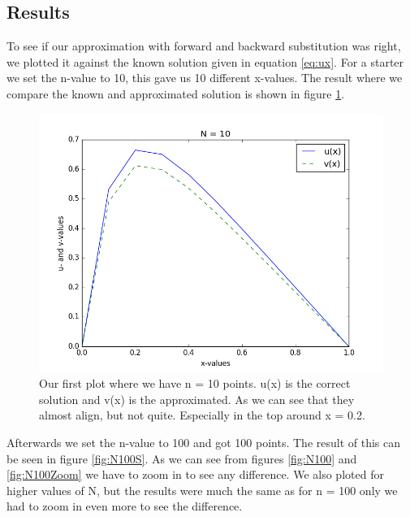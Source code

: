 \documentclass[12pt,a4paper]{article}
\begin{document}
\subsection*{Results}
To see if our approximation with forward and backward substitution was right, we plotted it against the known solution given in equation \eqref{eq:ux}. For a starter we set the n-value to 10, this gave us 10 different x-values. The result where we compare the known and approximated solution is shown in figure \ref{fig:N10}.
\begin{figure}[H]
\centering
\includegraphics[scale=0.5]{../plots/task_b_N_10.png}
\caption{Our first plot where we have n = 10 points. u(x) is the correct solution and v(x) is the approximated. As we can see that they almost align, but not quite. Especially in the top around x = 0.2.}
\label{fig:N10}
\end{figure}
Afterwards we set the n-value to 100 and got 100 points. The result of this can be seen in figure \ref{fig:N100S}. As we can see from figures \ref{fig:N100} and \ref{fig:N100Zoom} we have to zoom in to see any difference. We also ploted for higher values of N, but the results were much the same as for n = 100 only we had to zoom in even more to see the difference.
\end{document}
